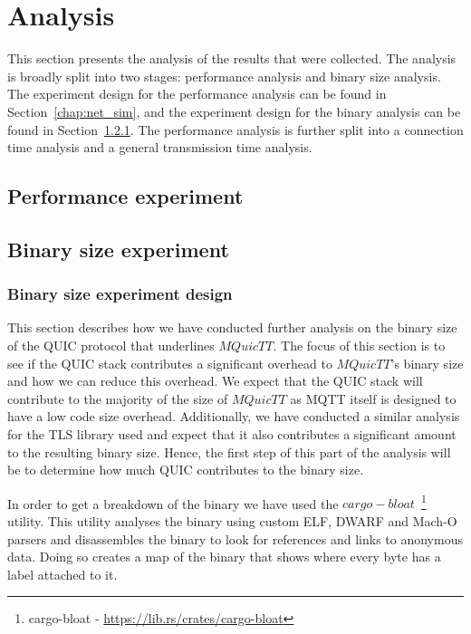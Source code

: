 \chapter{Analysis} \label{chapter:eval}

This section presents the analysis of the results that were collected.
The analysis is broadly split into two stages: performance analysis and binary size analysis.
The experiment design for the performance analysis can be found in Section~\ref{chap:net_sim}, and the experiment design for the binary analysis can be found in Section~\ref{sec:exp_bin}.
The performance analysis is further split into a connection time analysis and a general transmission time analysis.

\section{Performance experiment}




\newpage
\section{Binary size experiment}

\subsection{Binary size experiment design} \label{sec:exp_bin}

This section describes how we have conducted further analysis on the binary size of the QUIC protocol that underlines $MQuicTT$.
The focus of this section is to see if the QUIC stack contributes a significant overhead to $MQuicTT$'s binary size and how we can reduce this overhead.
We expect that the QUIC stack will contribute to the majority of the size of $MQuicTT$ as MQTT itself is designed to have a low code size overhead.
Additionally, we have conducted a similar analysis for the TLS library used and expect that it also contributes a significant amount to the resulting binary size.
Hence, the first step of this part of the analysis will be to determine how much QUIC contributes to the binary size.

In order to get a breakdown of the binary we have used the $cargo-bloat$~\footnote{cargo-bloat - \url{https://lib.rs/crates/cargo-bloat}} utility.
This utility analyses the binary using custom ELF, DWARF and Mach-O parsers and disassembles the binary to look for references and links to anonymous data.
Doing so creates a map of the binary that shows where every byte has a label attached to it.

